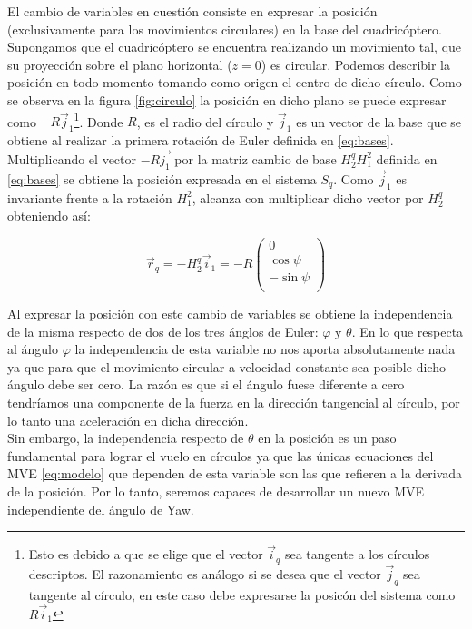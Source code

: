 \documentclass[main]{subfiles}
\begin{document}
El cambio de variables en cuesti\'on consiste en expresar la posici\'on (exclusivamente para los movimientos circulares) en la base del cuadric\'optero. Supongamos que el cuadric\'optero se encuentra realizando un movimiento tal, que su proyecci\'on sobre el plano horizontal ($z=0$) es circular. Podemos describir la posici\'on en todo momento tomando como origen el centro de dicho c\'irculo. Como se observa en la figura \ref{fig:circulo} la posici\'on en dicho plano se puede expresar como $-R\vec{j}_1$\footnote{Esto es debido a que se elige que el vector $\vec{i}_q$ sea tangente a los c\'irculos descriptos. El razonamiento es an\'alogo si se desea que el vector $\vec{j}_q$ sea tangente al c\'irculo, en este caso debe expresarse la posic\'on del sistema como $R\vec{i}_1$}. Donde $R$, es el radio del c\'irculo y $\vec{j}_1$ es un vector de la base que se obtiene al realizar la primera rotaci\'on de Euler definida en \ref{eq:bases}. Multiplicando el vector $-R\vec{j_1}$ por la matriz cambio de base $H_2^qH_1^2$ definida en \ref{eq:bases} se obtiene la posici\'on expresada en el sistema $S_q$. Como $\vec{j}_1$ es invariante frente a la rotaci\'on $H_1^2$, alcanza con multiplicar dicho vector por $H_2^q$ obteniendo as\'i:

\begin{equation}
\label{eq:pos_circ}
\vec{r}_q=-H_2^q\vec{i}_1=-R\left(\begin{array}{c}
0\\
\cos\psi\\
-\sin\psi\\
\end{array}\right)
\end{equation}

Al expresar la posici\'on con este cambio de variables se obtiene la independencia de la misma respecto de dos de los tres \'anglos de Euler: $\varphi$ y $\theta$. En lo que respecta al \'angulo $\varphi$ la independencia de esta variable no nos aporta absolutamente nada ya que para que el movimiento circular a velocidad constante sea posible dicho \'angulo debe ser cero. La raz\'on es que si el \'angulo fuese diferente a cero tendr\'iamos una componente de la fuerza en la direcci\'on tangencial al c\'irculo, por lo tanto una aceleraci\'on en dicha direcci\'on.\\

Sin embargo, la independencia respecto de $\theta$ en la posici\'on es un paso fundamental para lograr el vuelo en c\'irculos ya que las \'unicas ecuaciones del MVE \ref{eq:modelo} que dependen de esta variable son las que refieren a la derivada de la posici\'on. Por lo tanto, seremos capaces de desarrollar un nuevo MVE independiente del \'angulo de Yaw.\\
\end{document}
